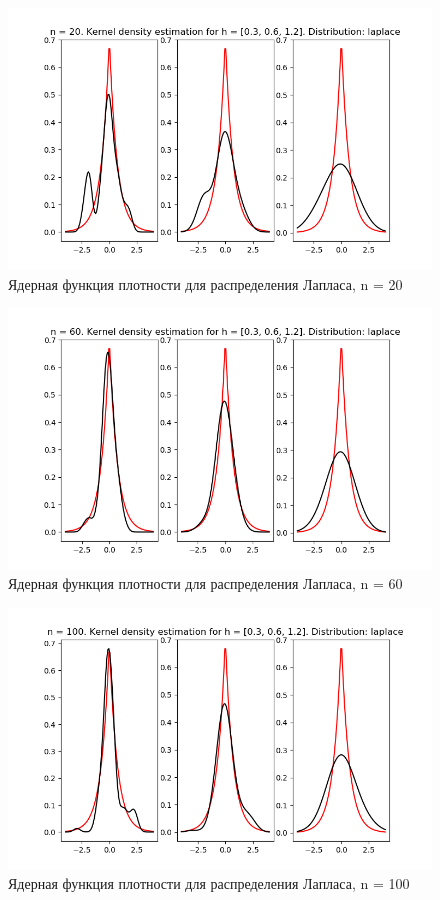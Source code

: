 \documentclass[a4]{article}
\begin{document}
\begin{center}
    \begin{figure}[H]
 \caption{Ядерная функция плотности для распределения Лапласа, n = 20}
\includegraphics[width=\textwidth]{d_laplace20.png}
\end{figure}
    \begin{figure}[H]
 \caption{Ядерная функция плотности для распределения Лапласа, n = 60}
\includegraphics[width=\textwidth]{d_laplace60.png}
\end{figure}
    \begin{figure}[H]
 \caption{Ядерная функция плотности для распределения Лапласа, n = 100}
\includegraphics[width=\textwidth]{d_laplace100.png}
\end{figure}


\end{center}
\end{document}
